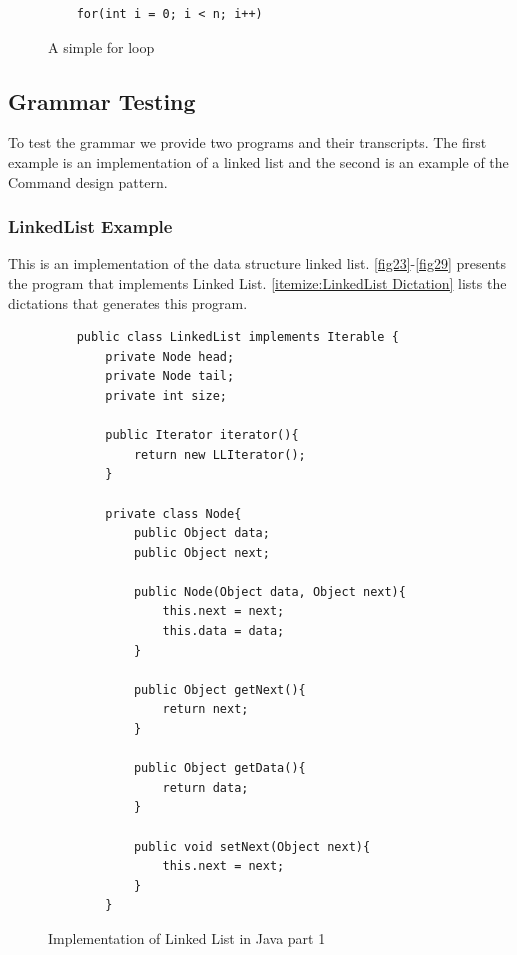 \begin{figure}[H]
	\begin{lstlisting}
	for(int i = 0; i < n; i++)
	\end{lstlisting}
	\caption{A simple for loop}
	\label{fig20}
\end{figure}

\subsection{Grammar Testing} \label{subsection: Grammar Testing}
To test the grammar we provide two programs and their transcripts. The first example is an implementation of a linked list and the second is an example of the Command design pattern. 
\subsubsection{LinkedList Example}
This is an implementation of the data structure linked list. \autoref{fig23}-\autoref{fig29} presents the program that implements Linked List. \autoref{itemize:LinkedList Dictation} lists the dictations that generates this program.
\begin{figure}[H]
	\begin{lstlisting}
	public class LinkedList implements Iterable {
	    private Node head;
	    private Node tail;
	    private int size;
	    
	    public Iterator iterator(){
	        return new LLIterator();
	    }
	    
		private class Node{
			public Object data;
			public Object next;
			
			public Node(Object data, Object next){
				this.next = next;
				this.data = data;
			}
			
			public Object getNext(){
				return next;
			}
			
			public Object getData(){
				return data;
			}
			
			public void setNext(Object next){
				this.next = next;
			}
		}
	\end{lstlisting}
	\caption{Implementation of Linked List in Java part 1}
	\label{fig23}
\end{figure}

